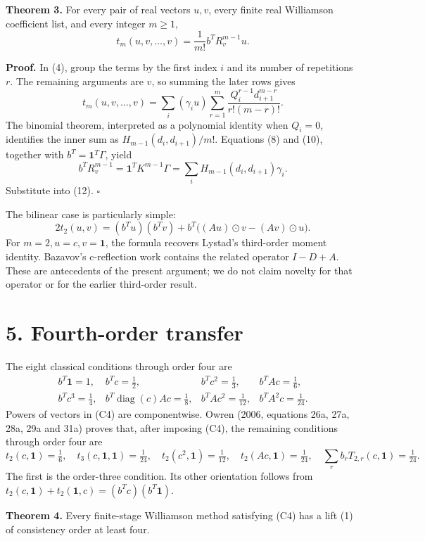 \documentclass[
  11pt,
  a4paper,
]{scrartcl}
\begin{document}
\textbf{Theorem 3.} For every pair of real vectors \(u,v\), every finite
real Williamson coefficient list, and every integer \(m\geq1\), \[
\boxed{t_m(u,v,\ldots,v)=\frac1{m!}b^TR_v^{m-1}u.}
\tag{11}
\]

\textbf{Proof.} In (4), group the terms by the first index \(i\) and its
number of repetitions \(r\). The remaining arguments are \(v\), so
summing the later rows gives \[
t_m(u,v,\ldots,v)
=\sum_i(\gamma_iu)\sum_{r=1}^m
\frac{Q_i^{r-1}d_{i+1}^{m-r}}{r!(m-r)!}.
\tag{12}
\] The binomial theorem, interpreted as a polynomial identity when
\(Q_i=0\), identifies the inner sum as \(H_{m-1}(d_i,d_{i+1})/m!\).
Equations (8) and (10), together with \(b^T=\mathbf1^T\Gamma\), yield \[
b^TR_v^{m-1}=\mathbf1^TK^{m-1}\Gamma
=\sum_iH_{m-1}(d_i,d_{i+1})\gamma_i.
\] Substitute into (12). \(\square\)

The bilinear case is particularly simple: \[
2t_2(u,v)=(b^Tu)(b^Tv)
+b^T\bigl((Au)\odot v-(Av)\odot u\bigr).
\tag{13}
\] For \(m=2,u=c,v=\mathbf1\), the formula recovers Lystad's third-order
moment identity. Bazavov's c-reflection work contains the related
operator \(I-D+A\). These are antecedents of the present argument; we do
not claim novelty for that operator or for the earlier third-order
result.

\section{5. Fourth-order transfer}\label{fourth-order-transfer}

The eight classical conditions through order four are \[
\begin{array}{llll}
b^T\mathbf1=1,&b^Tc=\tfrac12,&b^Tc^2=\tfrac13,&b^TAc=\tfrac16,\\
b^Tc^3=\tfrac14,&b^T\operatorname{diag}(c)Ac=\tfrac18,
&b^TAc^2=\tfrac1{12},&b^TA^2c=\tfrac1{24}.
\end{array}
\tag{C4}
\] Powers of vectors in (C4) are componentwise. Owren (2006, equations
26a, 27a, 28a, 29a and 31a) proves that, after imposing (C4), the
remaining conditions through order four are \[
t_2(c,\mathbf1)=\tfrac16,\quad
 t_3(c,\mathbf1,\mathbf1)=\tfrac1{24},\quad
 t_2(c^2,\mathbf1)=\tfrac1{12},\quad
 t_2(Ac,\mathbf1)=\tfrac1{24},\quad
 \sum_rb_rT_{2,r}(c,\mathbf1)=\tfrac1{24}.
\tag{L4}
\] The first is the order-three condition. Its other orientation follows
from \(t_2(c,\mathbf1)+t_2(\mathbf1,c)=(b^Tc)(b^T\mathbf1)\).

\textbf{Theorem 4.} Every finite-stage Williamson method satisfying (C4)
has a lift (1) of consistency order at least four.
\end{document}
